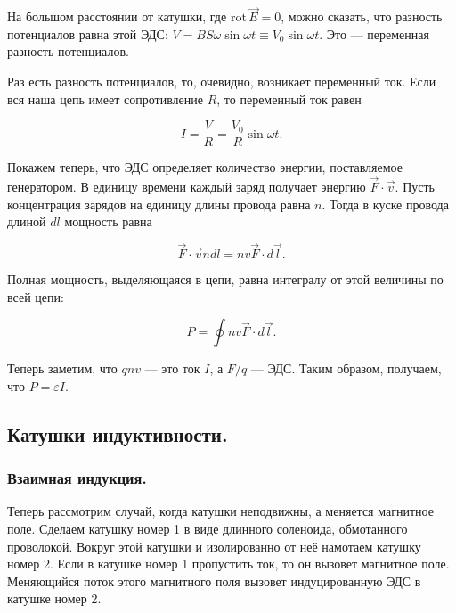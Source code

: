 \documentclass[12pt,a4paper]{article}
\numberwithin{equation}{section}
\numberwithin{equation}{section}
\newcommand{\rot}{\mathrm{rot}\,}
\newcommand{\vareps}{\varepsilon}
\begin{document}
На большом расстоянии от катушки, где $\rot \vec{E} =0$, можно
сказать, что разность потенциалов равна этой ЭДС: $V = B S \omega \sin
\omega t \equiv V_0 \sin \omega t$. Это --- переменная разность
потенциалов. 

Раз есть разность потенциалов, то, очевидно, возникает переменный
ток. Если вся наша цепь имеет сопротивление $R$, то переменный ток
равен

\begin{equation}
  \label{eq:generator_current}
  I = \frac{V}{R} = \frac{V_0}{R} \sin \omega t.
\end{equation}

Покажем теперь, что ЭДС определяет количество энергии, поставляемое
генератором. В единицу времени каждый заряд получает энергию $\vec{F}
\cdot \vec{v}$. Пусть концентрация зарядов на единицу длины провода
равна $n$. Тогда в куске провода длиной $dl$ мощность равна

\begin{equation}
  \label{eq:generator_power_1}
  \vec{F} \cdot \vec{v} n dl = nv \vec{F} \cdot d\vec{l}.
\end{equation}

Полная мощность, выделяющаяся в цепи, равна интегралу от этой
величины по всей цепи:

\begin{equation}
  \label{eq:generator_power_2}
  P = \oint nv \vec{F} \cdot d\vec{l}.
\end{equation}

Теперь заметим, что $qnv$ --- это ток $I$, а $F/q$ --- ЭДС. Таким
образом, получаем, что $P = \vareps I$.

\subsection{Катушки индуктивности.}
\label{sec:coil}

\subsubsection{Взаимная индукция.}
\label{sec:common_induction}

Теперь рассмотрим случай, когда катушки неподвижны, а меняется
магнитное поле. Сделаем катушку номер 1 в виде длинного соленоида,
обмотанного проволокой. Вокруг этой катушки и изолированно от неё
намотаем катушку номер 2. Если в катушке номер 1 пропустить ток, то он
вызовет магнитное поле. Меняющийся поток этого магнитного поля вызовет
индуцированную ЭДС в катушке номер 2. 
\end{document}
